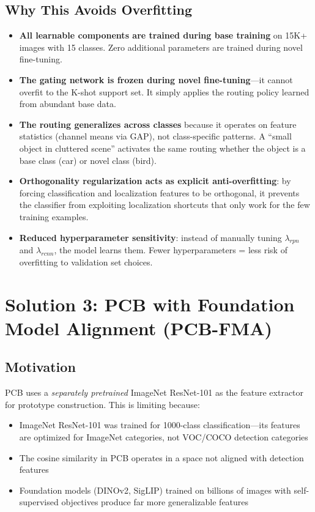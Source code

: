 \documentclass[11pt,a4paper]{article}
\begin{document}
\subsection{Why This Avoids Overfitting}

\begin{itemize}[nosep]
    \item \textbf{All learnable components are trained during base training} on 15K+ images with 15 classes. Zero additional parameters are trained during novel fine-tuning.
    \item \textbf{The gating network is frozen during novel fine-tuning}---it cannot overfit to the K-shot support set. It simply applies the routing policy learned from abundant base data.
    \item \textbf{The routing generalizes across classes} because it operates on feature statistics (channel means via GAP), not class-specific patterns. A ``small object in cluttered scene'' activates the same routing whether the object is a base class (car) or novel class (bird).
    \item \textbf{Orthogonality regularization acts as explicit anti-overfitting}: by forcing classification and localization features to be orthogonal, it prevents the classifier from exploiting localization shortcuts that only work for the few training examples.
    \item \textbf{Reduced hyperparameter sensitivity}: instead of manually tuning $\lambda_{rpn}$ and $\lambda_{rcnn}$, the model learns them. Fewer hyperparameters = less risk of overfitting to validation set choices.
\end{itemize}


\section{Solution 3: PCB with Foundation Model Alignment (PCB-FMA)}
\label{sec:pcbfma}

\subsection{Motivation}

PCB uses a \textit{separately pretrained} ImageNet ResNet-101 as the feature extractor for prototype construction. This is limiting because:
\begin{itemize}[nosep]
    \item ImageNet ResNet-101 was trained for 1000-class classification---its features are optimized for ImageNet categories, not VOC/COCO detection categories
    \item The cosine similarity in PCB operates in a space not aligned with detection features
    \item Foundation models (DINOv2, SigLIP) trained on billions of images with self-supervised objectives produce far more generalizable features
\end{itemize}
\end{document}

